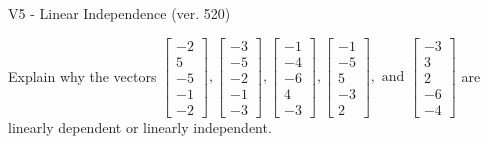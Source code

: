 \begin{exercise}
  \begin{exerciseTitle}V5 - Linear Independence (ver. 520)\end{exerciseTitle}
  \begin{exerciseStatement}
    Explain why the vectors \(\left[\begin{array}{r}
-2 \\
5 \\
-5 \\
-1 \\
-2
\end{array}\right] , \left[\begin{array}{r}
-3 \\
-5 \\
-2 \\
-1 \\
-3
\end{array}\right] , \left[\begin{array}{r}
-1 \\
-4 \\
-6 \\
4 \\
-3
\end{array}\right] , \left[\begin{array}{r}
-1 \\
-5 \\
5 \\
-3 \\
2
\end{array}\right] , \text{ and } \left[\begin{array}{r}
-3 \\
3 \\
2 \\
-6 \\
-4
\end{array}\right]\) are linearly dependent or linearly independent.	



\end{exerciseStatement}
\end{exercise}
